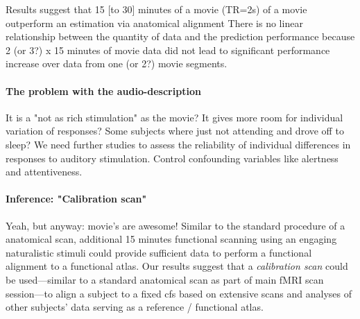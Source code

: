 

%
Results suggest that 15 [to 30] minutes of a movie (TR=2s) of a movie outperform
an estimation via anatomical alignment
%
There is no linear relationship between the quantity of data and the prediction
performance because 2 (or 3?) x 15 minutes of movie data did not lead to
significant performance increase over data from one (or 2?) movie segments.

\paragraph{The problem with the audio-description}

It is a "not as rich stimulation" as the movie?
%
It gives more room for individual variation of responses?
%
Some subjects where just not attending and drove off to sleep?
%
We need further studies to assess the reliability of individual differences in
responses to auditory stimulation.
%
Control confounding variables like alertness and attentiveness.


\paragraph{Inference: "Calibration scan"}

Yeah, but anyway: movie's are awesome!
%
Similar to the standard procedure of a anatomical scan, additional 15 minutes
functional scanning using an engaging naturalistic stimuli could provide
sufficient data to perform a functional alignment to a functional atlas.
%
Our results suggest that a \textit{calibration scan} could be used---similar to
a standard anatomical scan as part of main fMRI scan session---to align a
subject to a fixed \ac{cfs} based on extensive scans and analyses of other
subjects' data serving as a reference / functional atlas.


